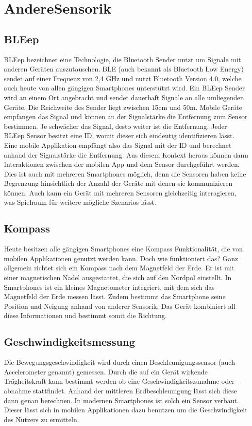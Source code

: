 \section{AndereSensorik}\label{sensorik}

\subsection*{BLEep}
BLEep bezeichnet eine Technologie, die Bluetooth Sender nutzt um Signale mit anderen Geräten auszutauschen. BLE (auch bekannt als Bluetooth Low Energy) sendet auf einer Frequenz von 2,4 GHz und nutzt Bluetooth Version 4.0, welche auch heute von allen gängigen Smartphones unterstützt wird.
Ein BLEep Sender wird an einem Ort angebracht und sendet dauerhaft Signale an alle umliegenden Geräte. Die Reichweite des Sender liegt zwischen 15cm und 50m.
Mobile Geräte empfangen das Signal und können an der Signalstärke die Entfernung zum Sensor bestimmen. Je schwächer das Signal, desto weiter ist die Entfernung.
Jeder BLEep Sensor besitzt eine ID, womit dieser sich eindeutig identifizieren lässt.
Eine mobile Applikation empfängt also das Signal mit der ID und berechnet anhand der Signalstärke die Entfernung. Aus diesem Kontext heraus können dann Interaktionen zwischen der mobilen App und dem Sensor durchgeführt werden. Dies ist auch mit mehreren Smartphones möglich, denn die Sensoren haben keine Begrenzung hinsichtlich der Anzahl der Geräte mit denen sie kommunizieren können. Auch kann ein Gerät mit mehreren Sensoren gleichzeitig interagieren, was Spielraum für weitere mögliche Szenarios lässt.

\subsection*{Kompass}
Heute besitzen alle gängigen Smartphones eine Kompass Funktionalität, die von mobilen Applikationen genutzt werden kann. Doch wie funktioniert das?
Ganz allgemein richtet sich ein Kompass nach dem Magnetfeld der Erde. Er ist mit einer magnetischen Nadel ausgestattet, die sich auf den Nordpol einstellt.
In Smartphones ist ein kleines Magnetometer integriert, mit dem sich das Magnetfeld der Erde messen lässt. Zudem bestimmt das Smartphone seine Position und Neigung anhand von anderer Sensorik. Das Gerät kombiniert all diese Informationen und bestimmt somit die Richtung.

\subsection*{Geschwindigkeitsmessung}
Die Bewegungsgeschwindigkeit wird durch einen Beschleunigungssensor (auch Accelerometer genannt) gemessen. Durch die auf ein Gerät wirkende Trägheitskraft kann bestimmt werden ob  eine Geschwindigkeitszunahme oder -abnahme stattfindet. Anhand der mittleren Erdbeschleunigung lässt sich diese dann genau berechnen.
In modernen Smartphones ist solch ein Sensor verbaut. Dieser lässt sich in mobilen Applikationen dazu benutzen um die Geschwindigkeit des Nutzers zu ermitteln.

